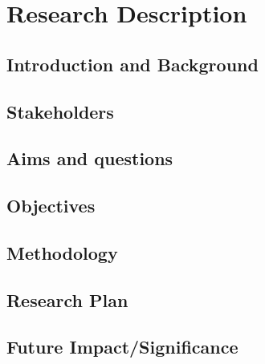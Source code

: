 \chapter{Research Description}\label{ch:Intro}

\section{Introduction and Background}\label{sec:disBackground}


\section{Stakeholders}\label{sec:disDyskrholders}


\section{Aims and questions}\label{sec:disAims}


\section{Objectives}\label{sec:disObjectives}


\section{Methodology}\label{sec:disMethodology}


\section{Research Plan}\label{sec:disResearchPlan}


\section{Future Impact/Significance}\label{sec:disFutureImpact}


%










